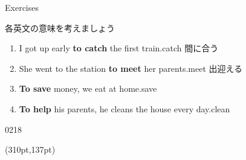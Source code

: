 \documentclass[aspectratio=169,xcolor={dvipsnames,table}]{beamer}
\begin{document}
\begin{frame}[plain]{Exercises}

{\small 各英文の意味を考えましょう}

 \begin{enumerate}
  \item I got up early \textbf{to catch} the first train.\hfill{\scriptsize catch  間に合う}
  \item She went to the station \textbf{to meet} her parents.\hfill{\scriptsize meet  出迎える}
  \item \textbf{To save} money, we eat at home.\hfill{\scriptsize save }
  \item \textbf{To help} his parents, he cleans the house every day.\hfill{\scriptsize clean }
 \end{enumerate}

\vspace{100pt}
 
\hfill{\tiny 0218}\,{\scriptsize {}}

\normalsize
\begin{textblock*}{0.4\linewidth}(310pt,137pt)
\end{textblock*}

\end{frame}
\end{document}
